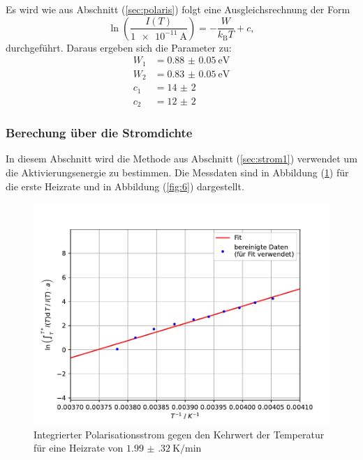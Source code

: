 \FloatBarrier
Es wird wie aus Abschnitt (\ref{sec:polaris}) folgt eine Ausgleichsrechnung der Form
\begin{equation}
    \label{eqn:lin}
    \ln\left(\dfrac{I(T)}{\SI{1e-11}{\ampere}}\right) = -\dfrac{W}{k_\mathrm{B} T} + c,
\end{equation}
durchgeführt.
Daraus ergeben sich die Parameter zu:
\begin{align*}
    W_\mathrm{1} &= \SI{0.88(5)}{\electronvolt} \\
    W_\mathrm{2} &= \SI{0.83(5)}{\electronvolt} \\
    c_\mathrm{1} &= \num{14(2)} \\
    c_\mathrm{2} &= \num{12(2)}
\end{align*}
\subsubsection{Berechung über die Stromdichte}
In diesem Abschnitt wird die Methode aus Abschnitt (\ref{sec:strom1}) verwendet um die Aktivierungsenergie zu bestimmen. Die Messdaten sind in Abbildung (\ref{fig:5}) für die erste Heizrate und in Abbildung (\ref{fig:6}) dargestellt.
\begin{figure}[h!]
  \centering
  \includegraphics[scale=0.8]{fig/plot5.pdf}
  \caption{Integrierter Polarisationsstrom gegen den Kehrwert der Temperatur für eine Heizrate von $\SI{1.99(32)}{\kelvin\per\minute}$}
  \label{fig:5}
\end{figure}
